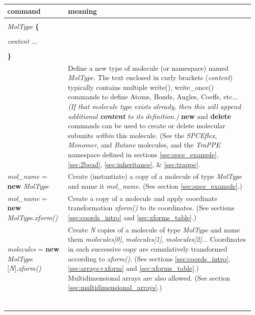 \documentclass[11pt]{article}
\begin{document}
\begin{longtable}[h]{l|p{9cm}}
\textbf{command} & \textbf{meaning}
\\
\hline
\hline
\begin{tabular}[t]{l}
\\
\textit{MolType} \textbf{\{} \\
\\
\hspace{0.35cm} \textit{content} ... \\
\\
\textbf{\}} \\
\end{tabular}
& 
Define a new type of molecule (or namespace) named \textit{MolType}.
The text enclosed in curly brackets (\textit{content})
typically contains multiple write(), write\_once()
commands to define Atoms, Bonds, Angles, Coeffs, etc...
\textit{(If that molecule type exists already, 
then this will append additional \textbf{content} to its definition.)}
\textbf{new} and \textbf{delete} commands can be used 
to create or delete molecular subunits \textit{within} this molecule.
(See the \textit{SPCEflex}, \textit{Monomer}, and \textit{Butane} 
 molecules, and the \textit{TraPPE} namespace 
 defined in sections \ref{sec:spce_example}, \ref{sec:2bead},
 \ref{sec:inheritance}, \& \ref{sec:trappe}.
\\
\hline
\textit{mol\_name} = \textbf{new} \textit{MolType} &
Create (instantiate) a copy of a molecule of type \textit{MolType}
and name it \textit{mol\_name}.
(See section \ref{sec:spce_example}.)
\\
\hline
\textit{mol\_name} = \textbf{new} \textit{MolType}.\textit{xform()} &
Create a copy of a molecule and
apply coordinate transformation \textit{xform()} to its coordinates.
(See sections \ref{sec:coords_intro} and \ref{sec:xforms_table}.)
\\
\hline
\textit{molecules} = 
  \textbf{new} \textit{MolType} [\textit{N}].\textit{xform()}&
Create \textit{N} copies of a molecule of type \textit{MolType}
and name them 
\textit{molecules[0]}, \textit{molecules[1]}, \textit{molecules[2]}...
Coordinates in each successive copy are cumulatively transformed 
according to \textit{xform()}.
(See sections \ref{sec:coords_intro}, \ref{sec:arrays+xform}
and \ref{sec:xforms_table}.)
Multidimensional arrays are also allowed.
(See section \ref{sec:multidimensional_arrays}.)
\\
\hline
\begin{tabular}[t]{l}

\end{tabular}
\end{longtable}
\end{document}
